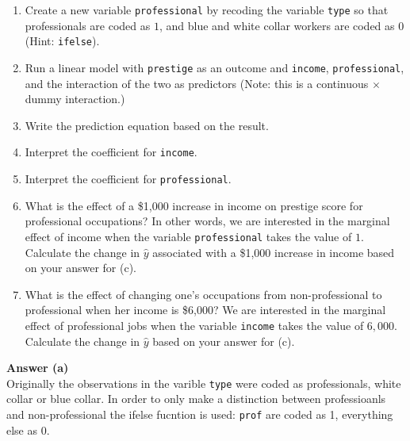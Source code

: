\documentclass[12pt,letterpaper]{article}
\begin{document}
\newpage
\begin{enumerate}
	
	\item [(a)]
	Create a new variable \texttt{professional} by recoding the variable \texttt{type} so that professionals are coded as $1$, and blue and white collar workers are coded as $0$ (Hint: \texttt{ifelse}).
	
	\vspace{1.5cm}
	
	
	\item [(b)]
	Run a linear model with \texttt{prestige} as an outcome and \texttt{income}, \texttt{professional}, and the interaction of the two as predictors (Note: this is a continuous $\times$ dummy interaction.)
	
	\vspace{1.5cm}
	\item [(c)]
	Write the prediction equation based on the result.
	
	\vspace{1.5cm}
	\item [(d)]
	Interpret the coefficient for \texttt{income}.
	
	\vspace{1.5cm}	
	\item [(e)]
	Interpret the coefficient for \texttt{professional}.
	
	\vspace{1.5cm}	\vspace{1.5cm}
	\item [(f)]
	What is the effect of a \$1,000 increase in income on prestige score for professional occupations? In other words, we are interested in the marginal effect of income when the variable \texttt{professional} takes the value of $1$. Calculate the change in $\hat{y}$ associated with a \$1,000 increase in income based on your answer for (c).
	
	\vspace{1.5cm}
	
	
	\item [(g)]
	What is the effect of changing one's occupations from non-professional to professional when her income is \$6,000? We are interested in the marginal effect of professional jobs when the variable \texttt{income} takes the value of $6,000$. Calculate the change in $\hat{y}$ based on your answer for (c).
	
	
\end{enumerate}

\vspace{2cm}
\noindent\textbf{Answer (a)}\\
\vspace{0.5cm}
\noindent Originally the observations in the varible \texttt{type} were coded as professionals, white collar or blue collar. In order to only make a distinction between professioanls and non-professional the ifelse fucntion is used: \texttt{prof} are coded as 1, everything else as 0. 
 
\end{document}
